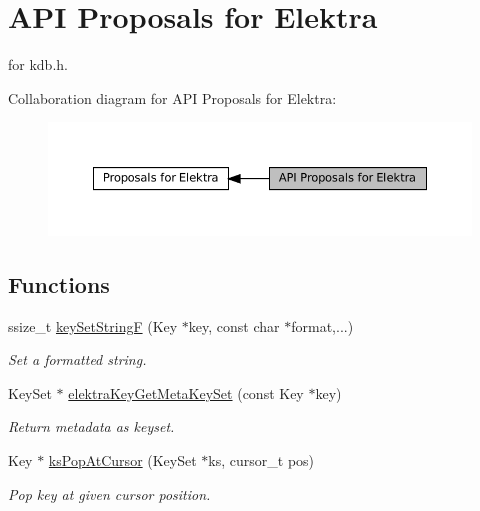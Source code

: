 \hypertarget{group__api}{}\section{A\+PI Proposals for Elektra}
\label{group__api}


for kdb.\+h.  


Collaboration diagram for A\+PI Proposals for Elektra\+:
\nopagebreak
\begin{figure}[H]
\begin{center}
\leavevmode
\includegraphics[width=350pt]{group__api}
\end{center}
\end{figure}
\subsection*{Functions}
\begin{DoxyCompactItemize}
\item 
ssize\+\_\+t \mbox{\hyperlink{group__api_ga812eb6c4f506dafa5733bf531c52199c}{key\+Set\+StringF}} (Key $\ast$key, const char $\ast$format,...)
\begin{DoxyCompactList}\small\item\em Set a formatted string. \end{DoxyCompactList}\item 
Key\+Set $\ast$ \mbox{\hyperlink{group__api_ga48120f254e09e0c5cceff4864f110ceb}{elektra\+Key\+Get\+Meta\+Key\+Set}} (const Key $\ast$key)
\begin{DoxyCompactList}\small\item\em Return metadata as keyset. \end{DoxyCompactList}\item 
Key $\ast$ \mbox{\hyperlink{group__api_ga32f8e3258033e970589f23d9d7102bd1}{ks\+Pop\+At\+Cursor}} (Key\+Set $\ast$ks, cursor\+\_\+t pos)
\begin{DoxyCompactList}\small\item\em Pop key at given cursor position. \end{DoxyCompactList}\end{DoxyCompactItemize}


